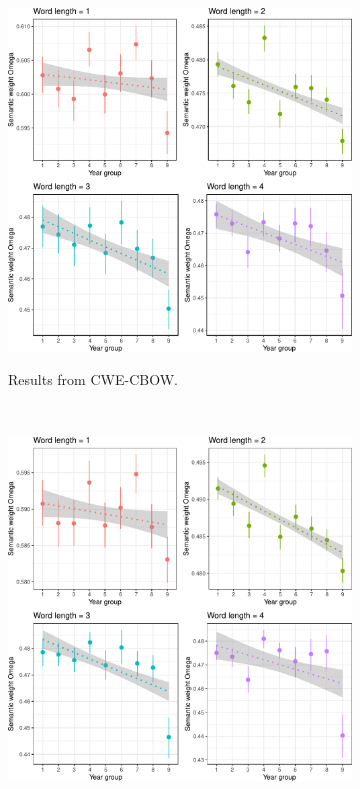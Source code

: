 \documentclass[output=paper]{langsci/langscibook}
\begin{document}
\begin{figure}
\centering
\begin{subfigure}{0.65\linewidth}
\centering
\includegraphics[width=\textwidth]{figures/XU_Omega_cbow_yeargroup_alllens_commonVocab_2by2}
\label{fig:omega_year_cbow}
\caption{Results from CWE-CBOW.}
\end{subfigure}\\
\begin{subfigure}{0.65\linewidth}
\centering
\includegraphics[width=\textwidth]{figures/XU_Omega_skipgram_yeargroup_alllens_commonVocab_2by2}

\end{subfigure}
\end{figure}
\end{document}
